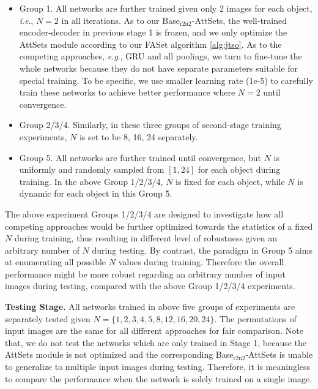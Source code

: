 \documentclass[twocolumn]{svjour3}    \pdfoutput=1
\newcommand{\nickname}{AttSets}
\newcommand{\faset}{FASet}
\newcommand{\ie}{\textit{i}.\textit{e}., }
\newcommand{\eg}{\textit{e}.\textit{g}., }
\begin{document}
\begin{itemize}[leftmargin=0.3cm]
\item Group 1. All networks are further trained given only 2 images for each object, \ie $N=2$ in all iterations. As to our Base$_{\textrm{r2n2}}$-AttSets, the well-trained encoder-decoder in previous stage 1 is frozen, and we only optimize the \nickname{} module according to our \faset{} algorithm \ref{alg:jtso}. As to the competing approaches, \eg GRU and all poolings, we turn to fine-tune the whole networks because they do not have separate parameters suitable for special training. To be specific, we use smaller learning rate (1e-5) to carefully train these networks to achieve better performance where $N=2$ until convergence.

\item Group 2/3/4. Similarly, in these three groups of second-stage training experiments, $N$ is set to be 8, 16, 24 separately. 

\item Group 5. All networks are further trained until convergence, but $N$ is uniformly and randomly sampled from $[1, 24]$ for each object during training. In the above Group 1/2/3/4, $N$ is fixed for each object, while $N$ is dynamic for each object in this Group 5. 
\end{itemize}

The above experiment Groups 1/2/3/4 are designed to investigate how all competing approaches would be further optimized towards the statistics of a fixed $N$ during training, thus resulting in different level of robustness given an arbitrary number of $N$ during testing. By contrast, the paradigm in Group 5 aims at enumerating all possible $N$ values during training. Therefore the overall performance might be more robust regarding an arbitrary number of input images during testing, compared with the above Group 1/2/3/4 experiments. 

\textbf{Testing Stage.}
All networks trained in above five groups of experiments are separately tested given $N = \{1, 2, 3, 4, 5, 8, 12, 16, 20,24\}$. The permutations of input images are the same for all different approaches for fair comparison. Note that, we do not test the networks which are only trained in Stage 1, because the \nickname{} module is not optimized and the corresponding Base$_{\textrm{r2n2}}$-AttSets is unable to generalize to multiple input images during testing. Therefore, it is meaningless to compare the performance when the network is solely trained on a single image.
\end{document}
